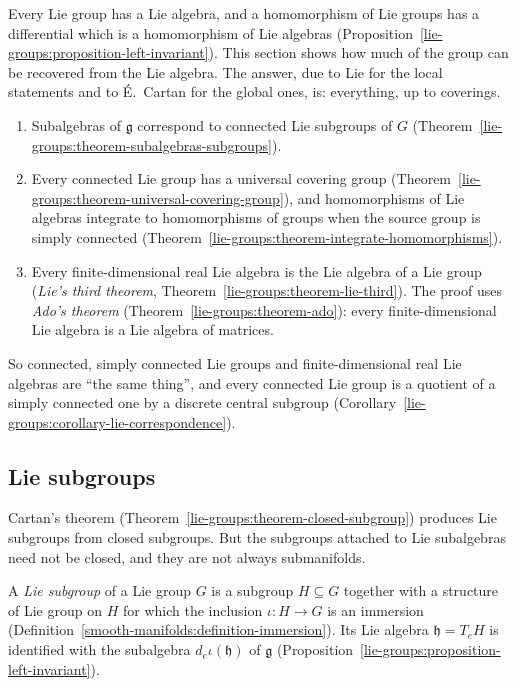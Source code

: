 Every Lie group has a Lie algebra, and a homomorphism of Lie groups has a differential which is a homomorphism of Lie algebras
(Proposition~\ref{lie-groups:proposition-left-invariant}). This section shows how much of the group can be recovered from the Lie algebra. The answer, due
to Lie for the local statements and to \'E.~Cartan for the global ones, is: everything, up to coverings.
\begin{enumerate}
\item Subalgebras of $\mathfrak{g}$ correspond to connected Lie subgroups of $G$ (Theorem~\ref{lie-groups:theorem-subalgebras-subgroups}).
\item Every connected Lie group has a universal covering group (Theorem~\ref{lie-groups:theorem-universal-covering-group}), and homomorphisms of Lie algebras
integrate to homomorphisms of groups when the source group is simply connected (Theorem~\ref{lie-groups:theorem-integrate-homomorphisms}).
\item Every finite-dimensional real Lie algebra is the Lie algebra of a Lie group (\emph{Lie's third theorem},
Theorem~\ref{lie-groups:theorem-lie-third}). The proof uses \emph{Ado's theorem} (Theorem~\ref{lie-groups:theorem-ado}): every finite-dimensional Lie algebra
is a Lie algebra of matrices.
\end{enumerate}
So connected, simply connected Lie groups and finite-dimensional real Lie algebras are ``the same thing'', and every connected Lie group is a quotient of a simply
connected one by a discrete central subgroup (Corollary~\ref{lie-groups:corollary-lie-correspondence}).

\subsection{Lie subgroups}\label{lie-groups:subsection-lie-subgroups}

Cartan's theorem (Theorem~\ref{lie-groups:theorem-closed-subgroup}) produces Lie subgroups from closed subgroups. But the subgroups attached to Lie
subalgebras need not be closed, and they are not always submanifolds.

\begin{definition}\label{lie-groups:definition-immersed-subgroup}
A \emph{Lie subgroup} of a Lie group $G$ is a subgroup $H \subseteq G$ together with a structure of Lie group on $H$ for which the inclusion $\iota \colon H \to G$ is an
immersion (Definition~\ref{smooth-manifolds:definition-immersion}). Its Lie algebra $\mathfrak{h} = T_eH$ is identified with the subalgebra $d_e\iota(\mathfrak{h})$ of
$\mathfrak{g}$ (Proposition~\ref{lie-groups:proposition-left-invariant}).
\end{definition}

